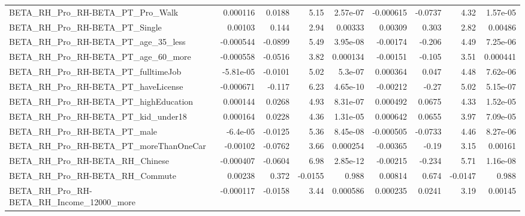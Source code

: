 \begin{tabular}{lrrrrrrrr}
BETA\_RH\_Pro\_RH-BETA\_PT\_Pro\_Walk                    &    0.000116 &       0.0188 &     5.15 & 2.57e-07 &  -0.000615 &     -0.0737 &         4.32 &      1.57e-05 \\
BETA\_RH\_Pro\_RH-BETA\_PT\_Single                      &     0.00103 &        0.144 &     2.94 &  0.00333 &    0.00309 &       0.303 &         2.82 &       0.00486 \\
BETA\_RH\_Pro\_RH-BETA\_PT\_age\_35\_less                 &   -0.000544 &      -0.0899 &     5.49 & 3.95e-08 &   -0.00174 &      -0.206 &         4.49 &      7.25e-06 \\
BETA\_RH\_Pro\_RH-BETA\_PT\_age\_60\_more                 &   -0.000558 &      -0.0516 &     3.82 & 0.000134 &   -0.00151 &      -0.105 &         3.51 &      0.000441 \\
BETA\_RH\_Pro\_RH-BETA\_PT\_fulltimeJob                 &   -5.81e-05 &      -0.0101 &     5.02 &  5.3e-07 &   0.000364 &       0.047 &         4.48 &      7.62e-06 \\
BETA\_RH\_Pro\_RH-BETA\_PT\_haveLicense                 &   -0.000671 &       -0.117 &     6.23 & 4.65e-10 &   -0.00212 &       -0.27 &         5.02 &      5.15e-07 \\
BETA\_RH\_Pro\_RH-BETA\_PT\_highEducation               &    0.000144 &       0.0268 &     4.93 & 8.31e-07 &   0.000492 &      0.0675 &         4.33 &      1.52e-05 \\
BETA\_RH\_Pro\_RH-BETA\_PT\_kid\_under18                 &    0.000164 &       0.0228 &     4.36 & 1.31e-05 &   0.000642 &      0.0655 &         3.97 &      7.09e-05 \\
BETA\_RH\_Pro\_RH-BETA\_PT\_male                        &    -6.4e-05 &      -0.0125 &     5.36 & 8.45e-08 &  -0.000505 &     -0.0733 &         4.46 &      8.27e-06 \\
BETA\_RH\_Pro\_RH-BETA\_PT\_moreThanOneCar              &    -0.00102 &      -0.0762 &     3.66 & 0.000254 &   -0.00365 &       -0.19 &         3.15 &       0.00161 \\
BETA\_RH\_Pro\_RH-BETA\_RH\_Chinese                     &   -0.000407 &      -0.0604 &     6.98 & 2.85e-12 &   -0.00215 &      -0.234 &         5.71 &      1.16e-08 \\
BETA\_RH\_Pro\_RH-BETA\_RH\_Commute                     &     0.00238 &        0.372 &  -0.0155 &    0.988 &    0.00814 &       0.674 &      -0.0147 &         0.988 \\
BETA\_RH\_Pro\_RH-BETA\_RH\_Income\_12000\_more           &   -0.000117 &      -0.0158 &     3.44 & 0.000586 &   0.000235 &      0.0241 &         3.19 &       0.00145 \\

\end{tabular}
